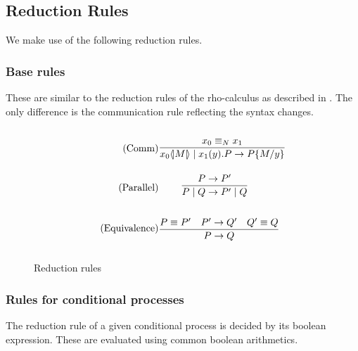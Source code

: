 \FloatBarrier

\subsection{Reduction Rules}
We make use of the following reduction rules.

\subsubsection{Base rules}
These are similar to the reduction rules of the rho-calculus as described in \citep{Meredith2005}. The only difference is the communication rule reflecting the syntax changes.

\begin{figure}[h]
	\begin{align}
	\tag{Comm} \infrule{x_0 \equiv_N x_1}{\lift{x_0}{M}\para\inp{x_1}{y}P\ra P\{M/y\}}&\\
	\tag{Parallel} \infrule{P\ra P'}{P\para Q\ra P'\para Q}&\\
	\tag{Equivalence} \infrule{P\equiv P'\quad P'\ra Q'\quad Q'\equiv Q}{P\ra Q}&
	\end{align}
	\caption{Reduction rules}
	\label{redrule}
\end{figure}

%
%
%


\FloatBarrier

\subsubsection{Rules for conditional processes}
The reduction rule of a given conditional process is decided by its boolean expression. These are evaluated using common boolean arithmetics.

